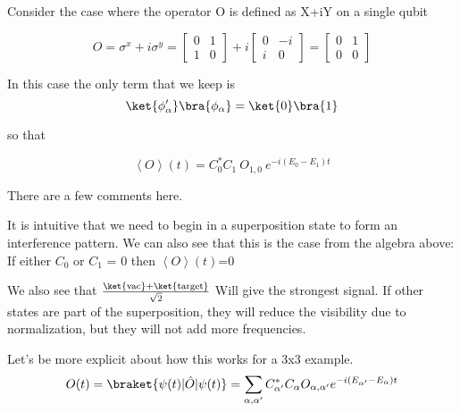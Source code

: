 Consider the case where the operator O is defined as X+iY on a single qubit

\begin{equation}
    O = \sigma^{x} + i \sigma^{y} =
    \begin{bmatrix}
        0 & 1 \\
        1 & 0
    \end{bmatrix}
    +
    i
    \begin{bmatrix}
        0 & -i \\
        i & 0
    \end{bmatrix}
    =
    \begin{bmatrix}
        0 & 1 \\
        0 & 0
    \end{bmatrix}
\end{equation}

In this case the only term that we keep is
\begin{equation}
    \ket{\phi_{\alpha}^{\prime}}
    \bra{\phi_{\alpha}}=
    \ket{0}
    \bra{1}
\end{equation}

so that

\begin{equation}
    \left< O \right>(t) = C^{*}_{0}C_{1} \: O_{1,0} \: e^{- i(E_{0} - E_{1} )t}
\end{equation}

There are a few comments here.

It is intuitive that we need to begin in a superposition state to form an interference pattern.
We can also see that this is the case from the algebra above:  If either $C_0$ or $C_1$ = 0 then $\left< O \right>(t)$=0

We also see that $\frac{ \ket{\text{vac}} + \ket{\text{target}} }{\sqrt{2}}$ Will give the strongest signal.
If other states are part of the superposition, they will reduce the visibility due to normalization, but they will not add more frequencies.

Let's be more explicit about how this works for a 3x3 example.
\begin{equation*}
    \begin{aligned}
        O(t) =\braket{\psi(t)|\hat{O}|\psi(t)} = \sum_{\alpha, \alpha^{\prime}} C^{*}_{\alpha^{\prime}} C_{\alpha} O_{\alpha, \alpha^{\prime}} e^{- i (E_{\alpha^{\prime}} - E_{\alpha}) t}   \\[2.0ex]
    \end{aligned}
\end{equation*}

